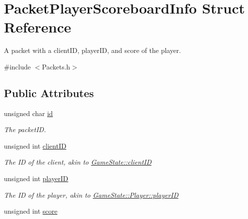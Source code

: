 \hypertarget{struct_packet_player_scoreboard_info}{\section{Packet\-Player\-Scoreboard\-Info Struct Reference}
\label{struct_packet_player_scoreboard_info}
}


A packet with a client\-I\-D, player\-I\-D, and score of the player.  




{\ttfamily \#include $<$Packets.\-h$>$}

\subsection*{Public Attributes}
\begin{DoxyCompactItemize}
\item 
\hypertarget{struct_packet_player_scoreboard_info_a57c4aeafb56667d32226fe2aacabb02b}{unsigned char \hyperlink{struct_packet_player_scoreboard_info_a57c4aeafb56667d32226fe2aacabb02b}{id}}\label{struct_packet_player_scoreboard_info_a57c4aeafb56667d32226fe2aacabb02b}

\begin{DoxyCompactList}\small\item\em The packet\-I\-D. \end{DoxyCompactList}\item 
\hypertarget{struct_packet_player_scoreboard_info_a1771129f213cfc2cb44e56ab54bee0a8}{unsigned int \hyperlink{struct_packet_player_scoreboard_info_a1771129f213cfc2cb44e56ab54bee0a8}{client\-I\-D}}\label{struct_packet_player_scoreboard_info_a1771129f213cfc2cb44e56ab54bee0a8}

\begin{DoxyCompactList}\small\item\em The I\-D of the client, akin to \hyperlink{class_game_state_a7c5acf663dc54a1d6de3254209b8fff2}{Game\-State\-::client\-I\-D} \end{DoxyCompactList}\item 
\hypertarget{struct_packet_player_scoreboard_info_aaf646a832b6f674bcd54ceacc9592ae6}{unsigned int \hyperlink{struct_packet_player_scoreboard_info_aaf646a832b6f674bcd54ceacc9592ae6}{player\-I\-D}}\label{struct_packet_player_scoreboard_info_aaf646a832b6f674bcd54ceacc9592ae6}

\begin{DoxyCompactList}\small\item\em The I\-D of the player, akin to \hyperlink{class_game_state_1_1_player_acbd28d89e6eb8611aa66452ec31e9133}{Game\-State\-::\-Player\-::player\-I\-D} \end{DoxyCompactList}\item 
\hypertarget{struct_packet_player_scoreboard_info_a33431a8aad88714cda248283d7b5ba5a}{unsigned int \hyperlink{struct_packet_player_scoreboard_info_a33431a8aad88714cda248283d7b5ba5a}{score}}\label{struct_packet_player_scoreboard_info_a33431a8aad88714cda248283d7b5ba5a}


\end{DoxyCompactItemize}
